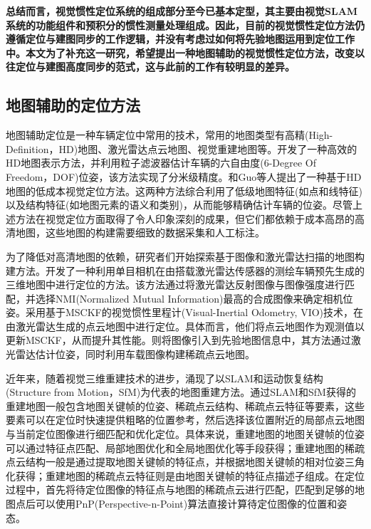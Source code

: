 \textbf{总结而言，视觉惯性定位系统的组成部分至今已基本定型，其主要由视觉SLAM系统的功能组件和预积分的惯性测量处理组成。因此，目前的视觉惯性定位方法仍遵循定位与建图同步的工作逻辑，并没有考虑过如何将先验地图运用到定位工作中。本文为了补充这一研究，希望提出一种地图辅助的视觉惯性定位方法，改变以往定位与建图高度同步的范式，这与此前的工作有较明显的差异。}

\subsection{地图辅助的定位方法}
地图辅助定位是一种车辆定位中常用的技术，常用的地图类型有高精(High-Definition，HD)地图、激光雷达点云地图、视觉重建地图等。\citet{jeong2020hdmi}开发了一种高效的HD地图表示方法，并利用粒子滤波器估计车辆的六自由度(6-Degree Of Freedom，DOF)位姿，该方法实现了分米级精度。\citet{xiao2020monocular}和Guo等人\cite{guo2021coarse}提出了一种基于HD地图的低成本视觉定位方法。这两种方法综合利用了低级地图特征(如点和线特征)以及结构特征(如地图元素的语义和类别)，从而能够精确估计车辆的位姿。尽管上述方法在视觉定位方面取得了令人印象深刻的成果，但它们都依赖于成本高昂的高清地图，这些地图的构建需要细致的数据采集和人工标注。

为了降低对高清地图的依赖，研究者们开始探索基于图像和激光雷达扫描的地图构建方法。\citet{stewart2012laps}开发了一种利用单目相机在由搭载激光雷达传感器的测绘车辆预先生成的三维地图中进行定位的方法。该方法通过将激光雷达反射图像与图像强度进行匹配，并选择NMI(Normalized Mutual Information)最高的合成图像来确定相机位姿。\citet{zuo2019visual}采用基于MSCKF的视觉惯性里程计(Visual-Inertial Odometry, VIO)技术，在由激光雷达生成的点云地图中进行定位。具体而言，他们将点云地图作为观测值以更新MSCKF，从而提升其性能。\citet{lin2021autonomous}则将图像引入到先验地图信息中，其方法通过激光雷达估计位姿，同时利用车载图像构建稀疏点云地图。

近年来，随着视觉三维重建技术的进步，涌现了以SLAM和运动恢复结构(Structure from Motion，SfM)\cite{schonberger2016structure}为代表的地图重建方法。通过SLAM和SfM获得的重建地图一般包含地图关键帧的位姿、稀疏点云结构、稀疏点云特征等要素，这些要素可以在定位时快速提供粗略的位置参考，然后选择该位置附近的局部点云地图与当前定位图像进行细匹配和优化定位。具体来说，重建地图的地图关键帧的位姿可以通过特征点匹配、局部地图优化和全局地图优化等手段获得；重建地图的稀疏点云结构一般是通过提取地图关键帧的特征点，并根据地图关键帧的相对位姿三角化获得；重建地图的稀疏点云特征则是由地图关键帧的特征点描述子组成。在定位过程中，首先将待定位图像的特征点与地图的稀疏点云进行匹配，匹配到足够的地图点后可以使用PnP(Perspective-n-Point)算法直接计算待定位图像的位置和姿态。

